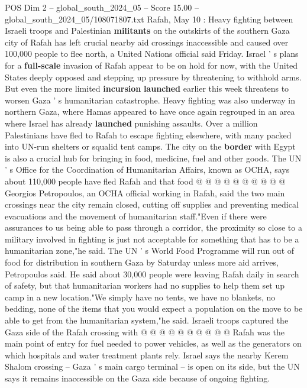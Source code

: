 \begin{textsample}{POS Dim 2 – global\_south\_2024\_05 – Score 15.00 – global\_south\_2024\_05/108071807.txt}  \label{ex:f2_pos_229}
Rafah, May 10 : Heavy fighting between Israeli troops and Palestinian \textbf{militants} on the outskirts of the southern Gaza city of Rafah has left crucial nearby aid crossings inaccessible and caused over 100,000 people to flee north, a United Nations official said Friday.
Israel ' s plans for a \textbf{full-scale} invasion of Rafah appear to be on hold for now, with the United States deeply opposed and stepping up pressure by threatening to withhold arms.
But even the more limited \textbf{incursion} \textbf{launched} earlier this week threatens to worsen Gaza ' s humanitarian catastrophe.
Heavy fighting was also underway in northern Gaza, where Hamas appeared to have once again regrouped in an area where Israel has already \textbf{launched} punishing assaults.
Over a million Palestinians have fled to Rafah to escape fighting elsewhere, with many packed into UN-run shelters or squalid tent camps.
The city on the \textbf{border} with Egypt is also a crucial hub for bringing in food, medicine, fuel and other goods.
The UN ' s Office for the Coordination of Humanitarian Affairs, known as OCHA, says about 110,000 people have fled Rafah and that food @ @ @ @ @ @ @ @ @ @ Georgios Petropoulos, an OCHA official working in Rafah, said the two main crossings near the city remain closed, cutting off supplies and preventing medical evacuations and the movement of humanitarian staff."Even if there were assurances to us being able to pass through a corridor, the proximity so close to a military involved in fighting is just not acceptable for something that has to be a humanitarian zone,"he said.
The UN ' s World Food Programme will run out of food for distribution in southern Gaza by Saturday unless more aid arrives, Petropoulos said.
He said about 30,000 people were leaving Rafah daily in search of safety, but that humanitarian workers had no supplies to help them set up camp in a new location."We simply have no tents, we have no blankets, no bedding, none of the items that you would expect a population on the move to be able to get from the humanitarian system,"he said.
Israeli troops captured the Gaza side of the Rafah crossing with @ @ @ @ @ @ @ @ @ @ Rafah was the main point of entry for fuel needed to power vehicles, as well as the generators on which hospitals and water treatment plants rely.
Israel says the nearby Kerem Shalom crossing -- Gaza ' s main cargo terminal -- is open on its side, but the UN says it remains inaccessible on the Gaza side because of ongoing fighting.

\end{textsample}
